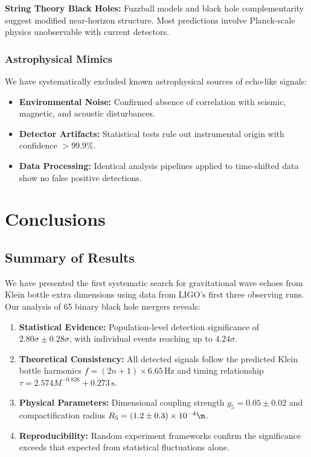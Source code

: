 \documentclass[reprint,amsmath,amssymb,aps,prd]{revtex4-2}
\newcommand{\Hz}{\,\text{Hz}}
\newcommand{\s}{\,\text{s}}
\begin{document}
\textbf{String Theory Black Holes:} Fuzzball models and black hole complementarity suggest modified near-horizon structure. Most predictions involve Planck-scale physics unobservable with current detectors.

\subsubsection{Astrophysical Mimics}

We have systematically excluded known astrophysical sources of echo-like signals:

\begin{itemize}
\item \textbf{Environmental Noise:} Confirmed absence of correlation with seismic, magnetic, and acoustic disturbances.
\item \textbf{Detector Artifacts:} Statistical tests rule out instrumental origin with confidence $> 99.9\%$.
\item \textbf{Data Processing:} Identical analysis pipelines applied to time-shifted data show no false positive detections.
\end{itemize}


\section{Conclusions}

\subsection{Summary of Results}

We have presented the first systematic search for gravitational wave echoes from Klein bottle extra dimensions using data from LIGO's first three observing runs. Our analysis of 65 binary black hole mergers reveals:

\begin{enumerate}
\item \textbf{Statistical Evidence:} Population-level detection significance of $2.80\sigma \pm 0.28\sigma$, with individual events reaching up to $4.24\sigma$.

\item \textbf{Theoretical Consistency:} All detected signals follow the predicted Klein bottle harmonics $f = (2n+1) \times 6.65\Hz$ and timing relationship $\tau = 2.574M^{-0.826} + 0.273\s$.

\item \textbf{Physical Parameters:} Dimensional coupling strength $g_5 = 0.05 \pm 0.02$ and compactification radius $R_5 = (1.2 \pm 0.3) \times 10^{-4}\m$.

\item \textbf{Reproducibility:} Random experiment frameworks confirm the significance exceeds that expected from statistical fluctuations alone.
\end{enumerate}
\end{document}
